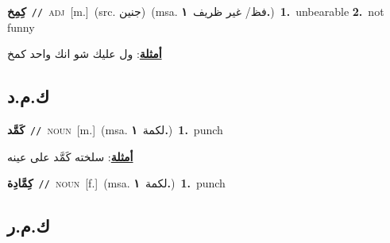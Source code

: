 \documentclass[10pt,a4paper,twoside]{article} %
\begin{document}
\begin{multicols}{2}
{\setlength\topsep{0pt}\textbf{\foreignlanguage{arabic}{كِمِخ}}\ {\color{gray}\texttt{//}\color{black}}\ \textsc{adj}\ [m.]\ (src. \color{gray}\foreignlanguage{arabic}{جنين}\color{black})\ \color{gray}(msa. \foreignlanguage{arabic}{فظ/ غير ظريف}~\foreignlanguage{arabic}{\textbf{١.}})\color{black}\ \textbf{1.}~unbearable  \textbf{2.}~not funny\  \begin{flushright}\color{gray}\foreignlanguage{arabic}{\textbf{\underline{\foreignlanguage{arabic}{أمثلة}}}: ول عليك شو انك واحد كمخ}\end{flushright}\color{black}} \vspace{2mm}

\vspace{-3mm}
\subsection*{\color{blue}\foreignlanguage{arabic}{ك.م.د}\color{blue}{}} 

{\setlength\topsep{0pt}\textbf{\foreignlanguage{arabic}{كَمَّد}}\ {\color{gray}\texttt{//}\color{black}}\ \textsc{noun}\ [m.]\ \color{gray}(msa. \foreignlanguage{arabic}{لكمة}~\foreignlanguage{arabic}{\textbf{١.}})\color{black}\ \textbf{1.}~punch\  \begin{flushright}\color{gray}\foreignlanguage{arabic}{\textbf{\underline{\foreignlanguage{arabic}{أمثلة}}}: سلخته كَمَّد على عينه}\end{flushright}\color{black}} \vspace{2mm}

{\setlength\topsep{0pt}\textbf{\foreignlanguage{arabic}{كِمَّادِة}}\ {\color{gray}\texttt{//}\color{black}}\ \textsc{noun}\ [f.]\ \color{gray}(msa. \foreignlanguage{arabic}{لكمة}~\foreignlanguage{arabic}{\textbf{١.}})\color{black}\ \textbf{1.}~punch\ } \vspace{2mm}

\vspace{-3mm}
\subsection*{\color{blue}\foreignlanguage{arabic}{ك.م.ر}\color{blue}{}} 


\end{multicols}
\end{document}
